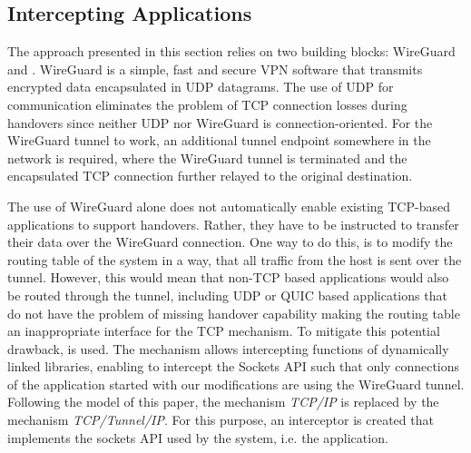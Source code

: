 \subsection{Intercepting Applications}
The approach presented in this section relies on two building blocks: WireGuard and \ld.
WireGuard is a simple, fast and secure VPN software that transmits encrypted data encapsulated in UDP datagrams.
The use of UDP for communication eliminates the problem of TCP connection losses during handovers since neither UDP nor WireGuard is connection-oriented.
For the WireGuard tunnel to work, an additional tunnel endpoint somewhere in the network is required, where the WireGuard tunnel is terminated and the encapsulated TCP connection further relayed to the original destination.

The use of WireGuard alone does not automatically enable existing TCP-based applications to support handovers.
Rather, they have to be instructed to transfer their data over the WireGuard connection.
One way to do this, is to modify the routing table of the system in a way, that all traffic from the host is sent over the tunnel.
However, this would mean that non-TCP based applications would also be routed through the tunnel, including UDP or QUIC based applications that do not have the problem of missing handover capability making the routing table an inappropriate interface for the TCP mechanism.
To mitigate this potential drawback, \ld is used.
The \ld mechanism allows intercepting functions of dynamically linked libraries, enabling to intercept the Sockets API such that only connections of the application started with our \ld modifications are using the WireGuard tunnel.
Following the model of this paper, the mechanism \emph{TCP/IP} is replaced by the mechanism \emph{TCP/Tunnel/IP}. 
For this purpose, an interceptor is created that implements the sockets API used by the system, i.e. the application.


